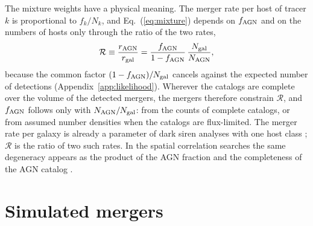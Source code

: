 \documentclass[aps,prd,reprint,superscriptaddress,nofootinbib,nolongbibliography,floatfix]{revtex4-2}
\newcommand{\fagn}{f_{\rm AGN}}
\newcommand{\RR}{\mathcal{R}}
\begin{document}
The mixture weights have a physical meaning.
The merger rate per host of tracer $k$ is proportional to $f_k/N_k$, and Eq.~(\ref{eq:mixture}) depends on $\fagn$ and on the numbers of hosts only through the ratio of the two rates,
\begin{equation}
\RR\equiv\frac{r_{\rm AGN}}{r_{\rm gal}}=\frac{\fagn}{1-\fagn}\,\frac{N_{\rm gal}}{N_{\rm AGN}},
\label{eq:rate}
\end{equation}
because the common factor $(1-\fagn)/N_{\rm gal}$ cancels against the expected number of detections (Appendix~\ref{app:likelihood}).
Wherever the catalogs are complete over the volume of the detected mergers, the mergers therefore constrain $\RR$, and $\fagn$ follows only with $N_{\rm AGN}/N_{\rm gal}$: from the counts of complete catalogs, or from assumed number densities when the catalogs are flux-limited.
The merger rate per galaxy is already a parameter of dark siren analyses with one host class \cite{Mastrogiovanni:2023emh}; $\RR$ is the ratio of two such rates.
In the spatial correlation searches the same degeneracy appears as the product of the AGN fraction and the completeness of the AGN catalog \cite{Veronesi:2023ugk,Zhu:2025rdv}.

\section{Simulated mergers}
\label{sec:sims}
\end{document}
